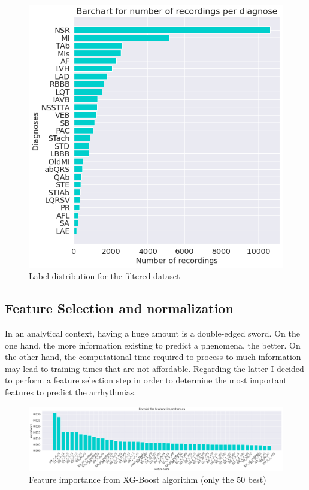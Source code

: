 \begin{figure}[H]
\centering
\includegraphics[scale=0.32]{img/label_ditro_filtered.png}
\caption{Label distribution for the filtered dataset}
\label{fig:label_ditro_filtered}
\end{figure}

\subsection{Feature Selection and normalization}\label{5fsn}

In an analytical context, having a huge amount is a double-edged sword. On the one hand, the more information existing to predict a phenomena, the better. On the other hand, the computational time required to process to much information may lead to training times that are not affordable. Regarding the latter I decided to perform a feature selection step in order to determine the most important features to predict the arrhythmias. 

\begin{figure}[H]
\centering
\includegraphics[scale=0.23]{img/feature_importance.png}
\caption{Feature importance from XG-Boost algorithm (only the 50 best)}
\label{fig:feature_importance}
\end{figure}

